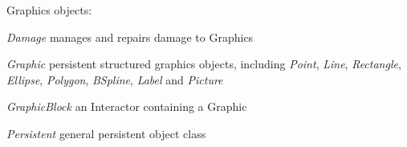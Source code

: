 \begin{defn}{Graphics objects: }

\item [{\em Damage} \hfill] manages and repairs damage to Graphics
\item [{\em Graphic} \hfill] persistent structured graphics objects,
    including {\em Point}, {\em Line}, {\em Rectangle}, \mbox{{\em Ellipse}}, 
    {\em Polygon}, {\em BSpline}, {\em Label} and {\em Picture}
\item [{\em GraphicBlock} \hfill] an Interactor containing a Graphic
\item [{\em Persistent} \hfill] general persistent object class

\end{defn}

\vfill

\small
{}
    

